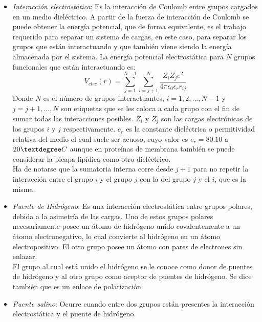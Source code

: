 \begin{itemize}
 \item \textit{Interacci\'{o}n electrost\'{a}tica}: Es la interacci\'{o}n de Coulomb entre grupos cargados en un medio diel\'{e}ctrico. A partir de la fuerza de interacci\'{o}n de Coulomb se puede obtener la energ\'{i}a potencial, que de forma equivalente, es el trabajo requerido para separar un sistema de cargas, en este caso, para separar los grupos que est\'{a}n interactuando y que tambi\'{e}n viene siendo la energ\'{i}a almacenada por el sistema. La energ\'{i}a potencial electrost\'{a}tica para $N$ grupos funcionales que est\'{a}n interactuando es:
\begin{equation}
V_{elec}(r)=\sum_{j=1}^{N-1}\sum_{i=j+1}^{N}\frac{Z_{i}Z_{j}e^2}{4 \pi \epsilon_0 \epsilon_{r} r_{ij}}
\end{equation}
Donde $N$ es el n\'{u}mero de grupos interactuantes, $i=1,2,...,N-1$ y $j=j+1,...,N$ son etiquetas que se les coloca a cada grupo con el fin de sumar todas las interacciones posibles. $Z_{i}$ y $Z_{j}$ son las cargas electr\'{o}nicas de los grupos $i$ y $j$ respectivamente. $e_r$ es la constante diel\'{e}ctrica o permitividad relativa del medio el cual suele ser acuoso, cuyo valor es $e_r=80.10$ a $20\textdegree C$ aunque en prote\'{i}nas de membrana tambi\'{e}n se puede considerar la bicapa lip\'{i}dica como otro diel\'{e}ctrico.\\
Ha de notarse que la sumatoria interna corre desde $j+1$ para no repetir la interacci\'{o}n entre el grupo $i$ y el grupo $j$ con la del grupo $j$ y el $i$, que es la misma.\\

  \item \textit{Puente de Hidr\'{o}geno}: Es una interacci\'{o}n electrost\'{a}tica entre grupos polares, debida a la asimetr\'{i}a de las cargas. Uno de estos grupos polares necesariamente posee un \'{a}tomo de hidr\'{o}geno unido covalentemente a un \'{a}tomo electronegativo, lo cual convierte al hidr\'{o}geno en un \'{a}tomo electropositivo. El otro grupo posee un \'{a}tomo con pares de electrones sin enlazar.\\
  El grupo al cual est\'{a} unido el hidr\'{o}geno se le conoce como donor de puentes de hidr\'{o}geno y al otro grupo como aceptor de puentes de hidr\'{o}geno. Se dice tambi\'{e}n que es un enlace de polarizaci\'{o}n.
 
 \item \textit{Puente salino}: Ocurre cuando entre dos grupos est\'{a}n presentes la interacci\'{o}n electrost\'{a}tica y el puente de hidr\'{o}geno.
 

\end{itemize}
